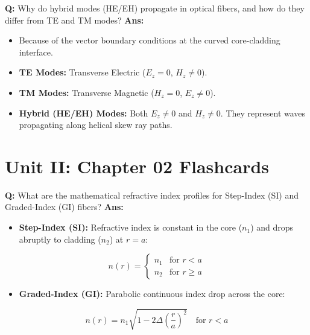 \documentclass[10pt,a4paper,twocolumn]{article}
\begin{document}
\begin{tcolorbox}[
  colback=white,
  colframe=UnitColorOne,
  colbacktitle=gray!10!white,
  coltitle=black,
  fonttitle=\bfseries\sffamily\small,
  title={Unit I $\bullet$ Card 8: Propagation Modes in Cylindrical Dielectric Rods},
  boxrule=1.2pt,
  arc=2mm,
  outer arc=2mm,
  boxsep=1.5mm,
  top=1mm,
  bottom=1mm,
  left=1.5mm,
  right=1.5mm,
  before skip=2.5mm,
  after skip=2.5mm
]
\textbf{Q:} Why do hybrid modes (HE/EH) propagate in optical fibers, and how do they differ from TE and TM modes?
\tcbline
\textbf{Ans:} \begin{itemize}
  \item   Because of the vector boundary conditions at the curved core-cladding interface.
  \item   \textbf{TE Modes:} Transverse Electric ($E_z = 0$, $H_z \neq 0$).
  \item   \textbf{TM Modes:} Transverse Magnetic ($H_z = 0$, $E_z \neq 0$).
  \item   \textbf{Hybrid (HE/EH) Modes:} Both $E_z \neq 0$ and $H_z \neq 0$. They represent waves propagating along helical skew ray paths.
\end{itemize}
\end{tcolorbox}

\section*{Unit II: Chapter 02 Flashcards}

\begin{tcolorbox}[
  colback=white,
  colframe=UnitColorTwo,
  colbacktitle=gray!10!white,
  coltitle=black,
  fonttitle=\bfseries\sffamily\small,
  title={Unit II $\bullet$ Card 1: Step-Index vs. Graded-Index Refractive Index Profiles},
  boxrule=1.2pt,
  arc=2mm,
  outer arc=2mm,
  boxsep=1.5mm,
  top=1mm,
  bottom=1mm,
  left=1.5mm,
  right=1.5mm,
  before skip=2.5mm,
  after skip=2.5mm
]
\textbf{Q:} What are the mathematical refractive index profiles for Step-Index (SI) and Graded-Index (GI) fibers?
\tcbline
\textbf{Ans:} \begin{itemize}
  \item   \textbf{Step-Index (SI):} Refractive index is constant in the core ($n_1$) and drops abruptly to cladding ($n_2$) at $r = a$:
\end{itemize}
        \[ n(r) = \begin{cases} n_1 & \text{for } r < a \\ n_2 & \text{for } r \ge a \end{cases} \]
\begin{itemize}
  \item   \textbf{Graded-Index (GI):} Parabolic continuous index drop across the core:
\end{itemize}
        \[ n(r) = n_1 \sqrt{1 - 2\Delta\left(\frac{r}{a}\right)^2} \quad \text{for } r < a \]
\end{tcolorbox}
\end{document}
